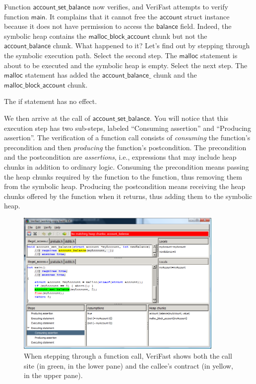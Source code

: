 \documentclass{article}
\begin{document}
Function $\mathsf{account\_set\_balance}$ now verifies, and
VeriFast attempts to verify function $\mathsf{main}$. It
complains that it cannot free the $\mathsf{account}$ struct
instance because it does not have permission to access the
$\mathsf{balance}$ field. Indeed, the symbolic heap contains
the $\mathsf{malloc\_block\_account}$ chunk but not the
$\mathsf{account\_balance}$ chunk. What happened to it? Let's
find out by stepping through the symbolic execution path.
Select the second step. The $\mathsf{malloc}$ statement is about
to be executed and the symbolic heap is empty. Select the next
step. The $\mathsf{malloc}$ statement has added the
$\mathsf{account\_balance\_}$ chunk and the
$\mathsf{malloc\_block\_account}$ chunk.

The if statement has no effect.

We then arrive at the call of $\mathsf{account\_set\_balance}$.
You will notice that this execution step has two sub-steps,
labeled ``Consuming assertion'' and ``Producing assertion''.
The verification of a function call consists of
\emph{consuming} the function's precondition and then
\emph{producing} the function's postcondition. The precondition
and the postcondition are \emph{assertions}, i.e., expressions
that may include heap chunks in addition to ordinary logic.
Consuming the precondition means passing the heap chunks
required by the function to the function, thus removing them
from the symbolic heap. Producing the postcondition means
receiving the heap chunks offered by the function when it
returns, thus adding them to the symbolic heap.

\begin{figure}
\begin{center}
\includegraphics[width=10cm]{illegal_access3.png}
\end{center}
\caption{When stepping through a function call, VeriFast shows both the call site (in green, in the lower pane) and the callee's contract (in yellow, in the upper pane).}\label{figure:call}
\end{figure}
\end{document}
